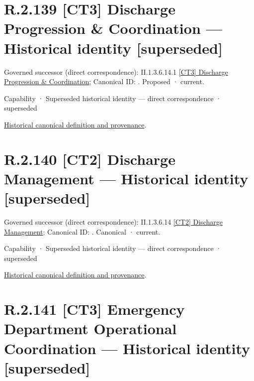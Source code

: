 \section*{R.2.139 [CT3] Discharge Progression \& Coordination — Historical identity [superseded]}
\label{navigation:R.2.139}

{\small Governed successor (direct correspondence): II.1.3.6.14.1 \hyperref[element:d6048993146b45639bab27860f94f34f]{[CT3] Discharge Progression \& Coordination}; Canonical ID: \texttt{}. Proposed · current.}\par
\label{element:68344272ca6049648a3ddae20c150f37}
{\small Capability · Superseded historical identity — direct correspondence · superseded}\par
\href{../../../../../../../continuum/strategy/capability/68344272ca6049648a3ddae20c150f37.md}{Historical canonical definition and provenance}.\par
\section*{R.2.140 [CT2] Discharge Management — Historical identity [superseded]}
\label{navigation:R.2.140}

{\small Governed successor (direct correspondence): II.1.3.6.14 \hyperref[element:ec5e8d6732764aa489c2dd7630fc8fef]{[CT2] Discharge Management}; Canonical ID: \texttt{}. Canonical · current.}\par
\label{element:c57c0721ab0040ccb24e88e5e92e8cf8}
{\small Capability · Superseded historical identity — direct correspondence · superseded}\par
\href{../../../../../../../continuum/strategy/capability/c57c0721ab0040ccb24e88e5e92e8cf8.md}{Historical canonical definition and provenance}.\par
\section*{R.2.141 [CT3] Emergency Department Operational Coordination — Historical identity [superseded]}
\label{navigation:R.2.141}

